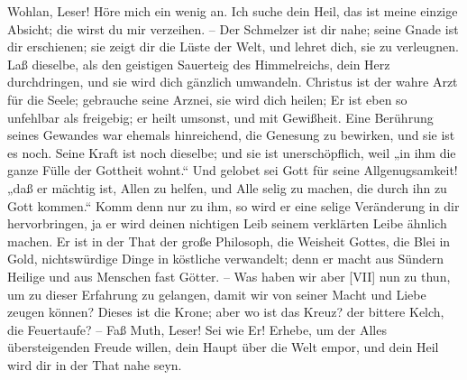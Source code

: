 Wohlan, Leser! Höre mich ein wenig an. Ich suche dein Heil, das ist meine einzige Absicht; die wirst du mir verzeihen. – Der Schmelzer ist dir nahe; seine Gnade ist dir erschienen; sie zeigt dir die Lüste der Welt, und lehret dich, sie zu verleugnen. Laß dieselbe, als den geistigen Sauerteig des Himmelreichs, dein Herz durchdringen, und sie wird dich gänzlich umwandeln. Christus ist der wahre Arzt für die Seele; gebrauche seine Arznei, sie wird dich heilen; Er ist eben so unfehlbar als freigebig; er heilt umsonst, und mit Gewißheit. Eine Berührung seines Gewandes war ehemals hinreichend, die Genesung zu bewirken, und sie ist es noch. Seine Kraft ist noch dieselbe; und sie ist unerschöpflich, weil „in ihm die ganze Fülle der Gottheit wohnt.“ Und gelobet sei Gott für seine Allgenugsamkeit! „daß er mächtig ist, Allen zu helfen, und Alle selig zu machen, die durch ihn zu Gott kommen.“ Komm denn nur zu ihm, so wird er eine selige Veränderung in dir hervorbringen, ja er wird deinen nichtigen Leib seinem verklärten Leibe ähnlich machen. Er ist in der That der große Philosoph, die Weisheit Gottes, die Blei in Gold, nichtswürdige Dinge in köstliche verwandelt; denn er macht aus Sündern Heilige und aus Menschen fast Götter. – Was haben wir aber [VII] nun zu thun, um zu dieser Erfahrung zu gelangen, damit wir von seiner Macht und Liebe zeugen können? Dieses ist die Krone; aber wo ist das Kreuz? der bittere Kelch, die Feuertaufe? – Faß Muth, Leser! Sei wie Er! Erhebe, um der Alles übersteigenden Freude willen, dein Haupt über die Welt empor, und dein Heil wird dir in der That nahe seyn.

